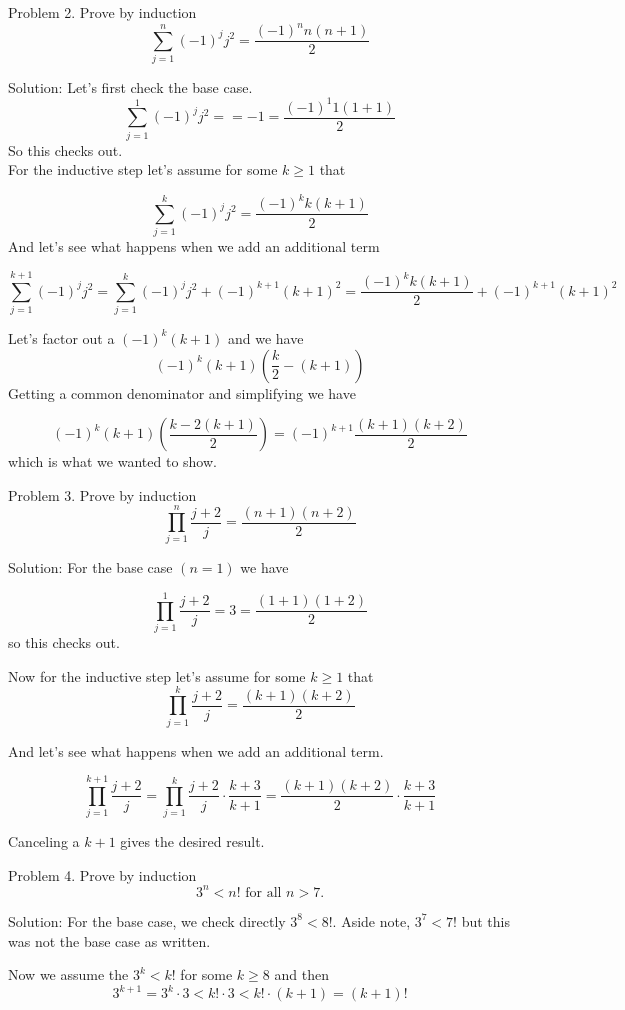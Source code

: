 \documentclass[16 pt]{amsart}
\theoremstyle{definition}
\theoremstyle{remark}
\numberwithin{equation}{subsection}
\begin{document}
\newpage
Problem 2.
Prove by induction
\[
\sum_{j=1}^n (-1)^j j^2 = \frac{(-1)^n n(n+1)}{2}
\]

\vspace{1in}

Solution: Let's first check the base case.
\[
\sum_{j=1}^1 (-1)^j j^2 = =-1 = \frac{(-1)^1 1(1+1)}{2}
\]
So this checks out.\\

For the inductive step let's assume for some $k\ge 1$ that 

\[
\sum_{j=1}^k (-1)^j j^2 = \frac{(-1)^k k(k+1)}{2}
\]
And let's see what happens when we add an additional term

\[
\sum_{j=1}^{k+1} (-1)^j j^2 = \sum_{j=1}^k (-1)^j j^2 + (-1)^{k+1}(k+1)^2 = \frac{(-1)^k k(k+1)}{2} + (-1)^{k+1}(k+1)^2
\]

Let's factor out a $(-1)^k(k+1)$ and we have
\[
(-1)^k (k+1) \left(\frac{k}{2} - (k+1)\right)
\]
Getting a common denominator and simplifying we have

\[
(-1)^k (k+1) \left(\frac{k-2(k+1)}{2}\right) = (-1)^{k+1}\frac{(k+1)(k+2)}{2}
\]
which is what we wanted to show.


\newpage
Problem 3.
Prove by induction
\[
\prod_{j=1}^{n} \frac{j+2}{j}= \frac{(n+1)(n+2)}{2} 
\]

\vspace{1in}

Solution: For the base case $(n=1)$ we have

\[
\prod_{j=1}^{1} \frac{j+2}{j}= 3 = \frac{(1+1)(1+2)}{2} 
\]
so this checks out.

Now for the inductive step let's assume for some $k\ge 1$ that
\[
\prod_{j=1}^{k} \frac{j+2}{j}= \frac{(k+1)(k+2)}{2} 
\]

And let's see what happens when we add an additional term.

\[
\prod_{j=1}^{k+1} \frac{j+2}{j}= \prod_{j=1}^{k} \frac{j+2}{j} \cdot \frac{k+3}{k+1}= \frac{(k+1)(k+2)}{2}\cdot \frac{k+3}{k+1}
\]

Canceling a $k+1$ gives the desired result.

\newpage

Problem 4.
Prove by induction
\[
3^n < n! \text{ for all } n>7.
\]

\vspace{1in}

Solution: For the base case, we check directly $3^8 < 8!$.  Aside note, $3^7 <7!$ but this was not the base case as written.

Now we assume the $3^k < k!$ for some $k\ge 8$ and then
\[
3^{k+1} = 3^k \cdot 3 < k! \cdot 3 < k!\cdot (k+1) = (k+1)!
\]
\end{document}
